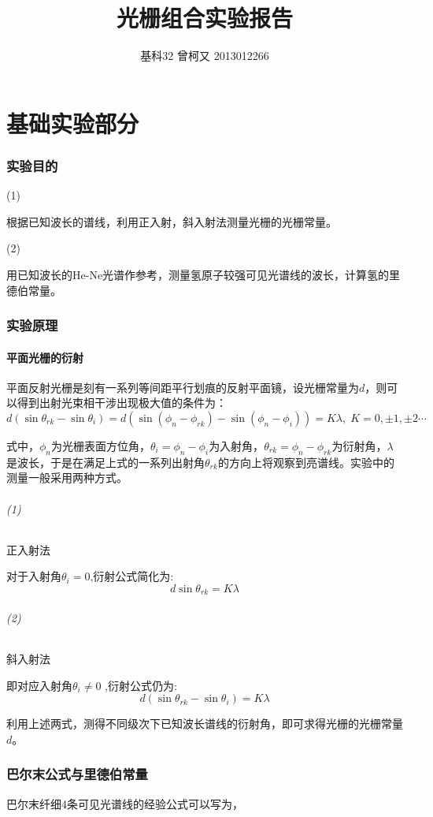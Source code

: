 \documentclass[10pt,a4paper,nocap]{ctexart}
\begin{document}
	\title{光栅组合实验报告}
	\author{基科32 曾柯又 2013012266}
	\date{\vspace{-5ex}}
	\maketitle
	\part{基础实验部分}
	\section{实验目的}
	\subparagraph{(1)}根据已知波长的谱线，利用正入射，斜入射法测量光栅的光栅常量。
	\subparagraph{(2)}用已知波长的He-Ne光谱作参考，测量氢原子较强可见光谱线的波长，计算氢的里德伯常量。
	\section{实验原理}
	\subsection{平面光栅的衍射}
	平面反射光栅是刻有一系列等间距平行划痕的反射平面镜，设光栅常量为$ d $，则可以得到出射光束相干涉出现极大值的条件为：\[d(\sin\theta_{rk} - \sin\theta_i) = d(\sin(\phi_n - \phi_{rk}) - \sin(\phi_n - \phi_i))= K\lambda,\; K = 0,\pm1,\pm2 \cdots\]
	
	 式中，\(\phi_n\)为光栅表面方位角，\(\theta_i = \phi
		 _n - \phi_i\)为入射角，\(\theta_{rk} = \phi_n - \phi_{rk}\)为衍射角，\(\lambda\)是波长，于是在满足上式的一系列出射角\(\theta_{rk}\)的方向上将观察到亮谱线。实验中的测量一般采用两种方式。
		 \paragraph{(1)}正入射法
		 
		 对于入射角\(\theta_i = 0\),衍射公式简化为:\[d\sin\theta_{rk} = K\lambda\]
		 \paragraph{(2)}斜入射法
		 
		 即对应入射角\(\theta_i \neq 0\) ,衍射公式仍为:\[d(\sin\theta_{rk} - \sin\theta_i) = K\lambda \]
		 
		 利用上述两式，测得不同级次下已知波长谱线的衍射角，即可求得光栅的光栅常量\(d\)。
		\section{巴尔末公式与里德伯常量}
		巴尔末纤细4条可见光谱线的经验公式可以写为，
\end{document}

